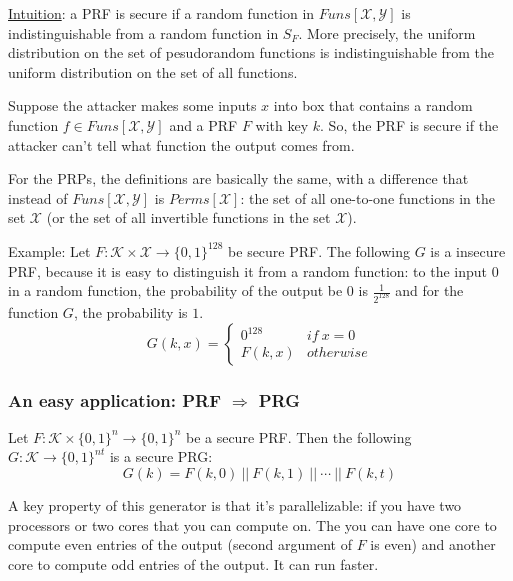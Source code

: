 \documentclass[12pt]{book}
\begin{document}
\underline{Intuition}: a PRF is secure if a random function in $Funs[\mathcal{X},\mathcal{Y}]$ is indistinguishable from a random function in $S_{F}$. More precisely, the uniform distribution on the set of pesudorandom functions is indistinguishable from the uniform distribution on the set of all functions.
\begin{center}
\end{center}

Suppose the attacker makes some inputs $x$ into box that contains a random function $f\in Funs[\mathcal{X},\mathcal{Y}]$ and a PRF $F$ with key $k$. So, the PRF is secure if the attacker can't tell what function the output comes from.

For the PRPs, the definitions are basically the same, with a difference that instead of $Funs[\mathcal{X},\mathcal{Y}]$ is $Perms[\mathcal{X}]$: the set of all one-to-one functions in the set $\mathcal{X}$ (or the set of all invertible functions in the set $\mathcal{X}$).

Example: Let $F:\mathcal{K}\times\mathcal{X}\rightarrow\{0,1\}^{128}$ be secure PRF. The following $G$ is a insecure PRF, because it is easy to distinguish it from a random function: to the input 0 in a random function, the probability of the output be 0 is $\frac{1}{2^{128}}$ and for the function $G$, the probability is $1$.
$$G(k,x)=\left\{\begin{array}{cl}
	0^{128}&if\ x=0\\[0.5cm]
	F(k,x)&otherwise
\end{array}\right.$$

\subsubsection{An easy application: PRF $\Rightarrow$ PRG}
Let $F:\mathcal{K}\times\{0,1\}^{n}\rightarrow\{0,1\}^{n}$ be a secure PRF. Then the following $G:\mathcal{K}\rightarrow\{0,1\}^{nt}$ is a secure PRG:
$$G(k)=F(k,0)\ ||\ F(k,1)\ ||\ \cdots\ ||\ F(k,t)$$

A key property of this generator is that it's parallelizable: if you have two processors or two cores that you can compute on. The you can have one core to compute even entries of the output (second argument of $F$ is even) and another core to compute odd entries of the output. It can run faster.
\end{document}
